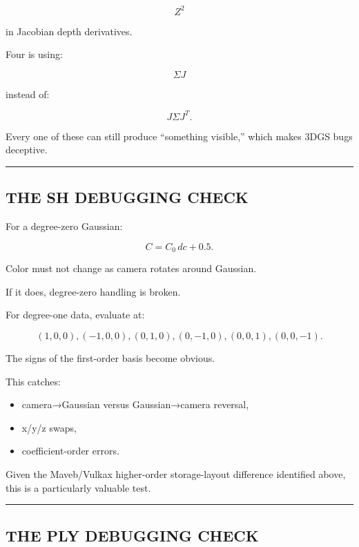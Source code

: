 \[
Z^2
\]

in Jacobian depth derivatives.

Four is using:

\[
\Sigma J
\]

instead of:

\[
J\Sigma J^T.
\]

Every one of these can still produce ``something visible,'' which makes 3DGS bugs deceptive.

\begin{center}\rule{0.5\linewidth}{0.5pt}\end{center}

\subsection{THE SH DEBUGGING CHECK}\label{04-visual-computing-ii-ch038-the-sh-debugging-check}

For a degree-zero Gaussian:

\[
C=
C_0\,dc+0.5.
\]

Color must not change as camera rotates around Gaussian.

If it does, degree-zero handling is broken.

For degree-one data, evaluate at:

\[
(1,0,0),
(-1,0,0),
(0,1,0),
(0,-1,0),
(0,0,1),
(0,0,-1).
\]

The signs of the first-order basis become obvious.

This catches:

\begin{itemize}
\tightlist
\item
  camera→Gaussian versus Gaussian→camera reversal,
\item
  x/y/z swaps,
\item
  coefficient-order errors.
\end{itemize}

Given the Maveb/Vulkax higher-order storage-layout difference identified above, this is a particularly valuable test.

\begin{center}\rule{0.5\linewidth}{0.5pt}\end{center}

\subsection{THE PLY DEBUGGING CHECK}\label{04-visual-computing-ii-ch038-the-ply-debugging-check}

